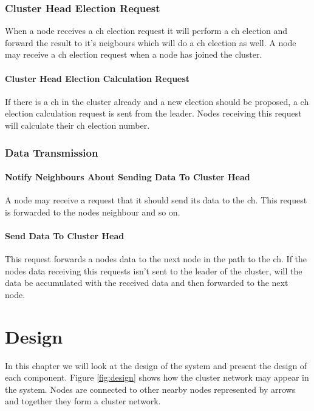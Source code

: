 \documentclass[USenglish]{uit-thesis}
\begin{document}
\subsection{Cluster Head Election Request}
When a node receives a \gls{ch} election request it will perform a \gls{ch} election and forward the result to it's neigbours which will do a \gls{ch} election as well.
A node may receive a \gls{ch} election request when a node has joined the cluster.

\subsubsection{Cluster Head Election Calculation Request}
If there is a \gls{ch} in the cluster already and a new election should be proposed, a \gls{ch} election calculation request is sent from the leader. Nodes receiving this request will calculate their \gls{ch} election number. %

\subsection{Data Transmission}
\subsubsection{Notify Neighbours About Sending Data To Cluster Head}
A node may receive a request that it should send its data to the \gls{ch}. This request is forwarded to the nodes neighbour and so on.

\subsubsection{Send Data To Cluster Head}
This request forwards a nodes data to the next node in the path to the \gls{ch}. If the nodes data receiving this requests isn't sent to the leader of the cluster, will the data be accumulated with the received data and then forwarded to the next node.



\chapter{Design}
\glsresetall
In this chapter we will look at the design of the system and present the design of each component. Figure \ref{fig:design} shows how the cluster network may appear in the system. Nodes are connected to other nearby nodes represented by arrows and together they form a cluster network.
\end{document}

